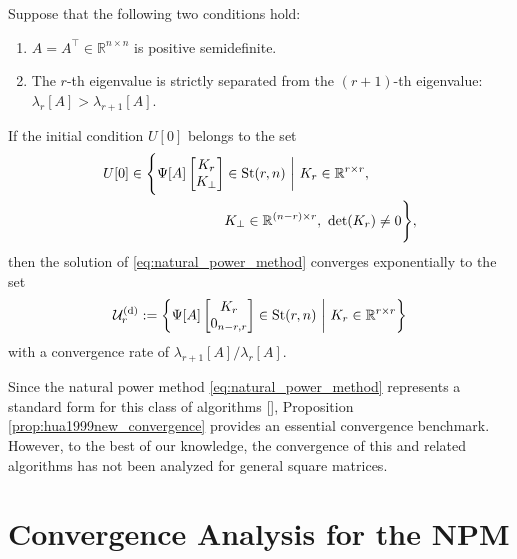 \documentclass{ifacconf}
\begin{document}
\begin{prop}\label{prop:hua1999new_convergence}
Suppose that the following two conditions hold:
\begin{enumerate}
    \item $A = A^{\top} \in \mathbb{R}^{n\times n}$ is positive semidefinite.
    \item The $r$-th eigenvalue is strictly separated from the $(r+1)$-th eigenvalue: $\lambda _{r}[A] > \lambda _{r+1}[A]$.
\end{enumerate}
If the initial condition $U[0]$ belongs to the set
\begin{align*}
    U[0] \in \Bigg{\{} 
    \Psi [A] \begin{bmatrix} K_{r} \\ K_{\perp} \end{bmatrix} 
    & 
    \in \mathrm{St}(r,n) \ \bigg| \ K_{r} \in \mathbb{R}^{r\times r}, 
    \\ &
     K_{\perp} \in \mathbb{R}^{(n-r) \times r} ,\ \mathrm{det}(K_{r}) \neq 0 \Bigg{\}},
\end{align*}
then the solution of \eqref{eq:natural_power_method} converges exponentially to the set
\begin{align}
    \mathcal{U}_{r}^{\rm (d)} := \left\{ \Psi [A]  \begin{bmatrix}
    K_{r} \\ 0_{n-r,r}
    \end{bmatrix}
    \in \mathrm{St}(r,n) \ \bigg| \ K_{r}\in \mathbb{R}^{r\times r}
    \right\} 
    \label{eq:StableEquilibriumSets_natural_power_method}
\end{align}
with a convergence rate of $\lambda _{r+1}[A]/\lambda _{r}[A]$.
\end{prop}

Since the natural power method \eqref{eq:natural_power_method} represents a standard form for this class of algorithms [\cite{hua1999new,attallah2002fast,badeau2005fast,hua2004asymptotical}], Proposition \ref{prop:hua1999new_convergence} provides an essential convergence benchmark. However, to the best of our knowledge, the convergence of this and related algorithms has not been analyzed for general square matrices.



\section{Convergence Analysis for the NPM}
\label{sec:main_natural_power_method}
\end{document}
